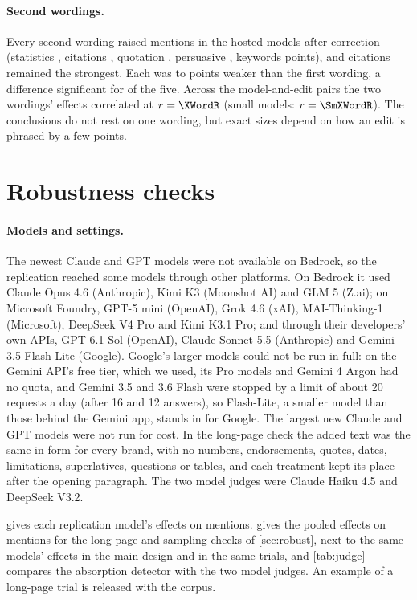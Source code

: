 \paragraph{Second wordings.} Every second wording raised mentions in the hosted models after
correction (statistics \XMenStatisticsB, citations \XMenCitationsB, quotation \XMenQuotationB, persuasive
\XMenPersuasiveB, keywords \XMenKeywordStuffingB{} points), and citations remained the strongest. Each was
\XWordMenMinU{} to \XWordMenMaxU{} points weaker than the first wording, a difference significant for \XWordMenNSig{}
of the five. Across the \XWordPairs{} model-and-edit pairs the two wordings' effects correlated at $r = \XWordR$
(small models: $r = \SmXWordR$). The conclusions do not rest on one wording, but exact sizes depend on how an edit is
phrased by a few points.

\section{Robustness checks}
\label{app:robust}

\paragraph{Models and settings.} The newest Claude and GPT models were not available on Bedrock, so the replication
reached some models through other platforms. On Bedrock it used Claude Opus 4.6 (Anthropic), Kimi K3 (Moonshot AI) and
GLM 5 (Z.ai); on Microsoft Foundry, GPT-5 mini (OpenAI), Grok 4.6 (xAI), MAI-Thinking-1 (Microsoft), DeepSeek V4 Pro and
Kimi K3.1 Pro; and through their developers' own APIs, GPT-6.1 Sol (OpenAI), Claude Sonnet 5.5 (Anthropic) and Gemini
3.5 Flash-Lite (Google). Google's larger models could not be run in full: on the Gemini API's free tier, which we used,
its Pro models and Gemini 4 Argon had no quota, and Gemini 3.5 and 3.6 Flash were stopped by a limit of about 20 requests
a day (after 16 and 12 answers), so Flash-Lite, a smaller model than those behind the Gemini app, stands in for Google.
The largest new Claude and GPT models were not run for cost. In the long-page check the added text was the same in form
for every brand, with no numbers, endorsements, quotes, dates, limitations, superlatives, questions or tables, and each
treatment kept its place after the opening paragraph. The two model judges were Claude Haiku 4.5 and DeepSeek V3.2.

 gives each replication model's effects on mentions.  gives the pooled effects
on mentions for the long-page and sampling checks of \cref{sec:robust}, next to the same models' effects in the main
design and in the same trials, and \cref{tab:judge} compares the absorption detector with the two model judges. An
example of a long-page trial is released with the corpus.

